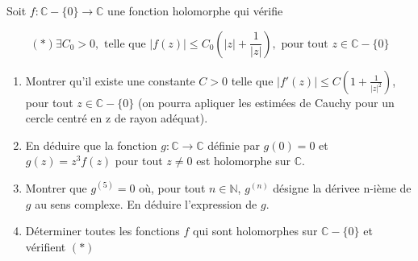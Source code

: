 \documentclass[10pt,a4paper,oneside]{article}
\newenvironment{exercice}[1][Exercice]{\begin{trivlist}
\item[\hskip \labelsep {\bfseries #1}]}{\end{trivlist}}
\begin{document}
\begin{exercice}
Soit $f: \mathbb{C} - \{ 0 \} \to \mathbb{C}$ une fonction holomorphe qui vérifie

\[ (*) \exists C_0 > 0, \text{ telle que } |f(z)| \leq C_0(|z| + \frac{1}{|z|}), \text{ pour tout } z \in \mathbb{C} - \{ 0 \} \]

\begin{enumerate}
\item
Montrer qu'il existe une constante $C > 0$ telle que $|f'(z)| \leq C(1 + \frac{1}{|z|^2})$, pour tout $z \in \mathbb{C} - \{ 0 \}$ (on pourra apliquer les estimées de Cauchy pour un cercle centré en z de rayon adéquat).

\item
En déduire que la fonction $g: \mathbb{C} \to \mathbb{C}$ définie par $g(0) = 0$ et $g(z) = z^3 f(z)$ pour tout $z \neq 0$ est holomorphe sur $\mathbb{C}$.

\item
Montrer que $g^{(5)} = 0$ où, pour tout $n \in \mathbb{N}$, $g^{(n)}$ désigne la dérivee n-ième de $g$ au sens complexe. En déduire l'expression de $g$.

\item
Déterminer toutes les fonctions $f$ qui sont holomorphes sur $\mathbb{C} - \{ 0 \}$ et vérifient $(*)$
\end{enumerate}

\end{exercice}
\end{document}
